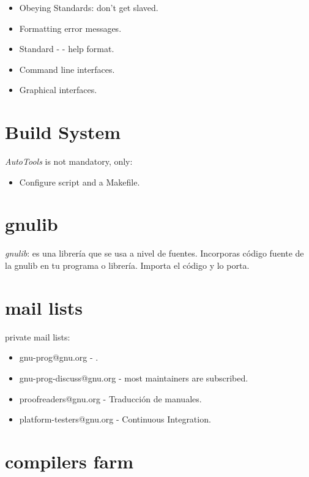 \documentclass[11pt]{scrartcl}
\begin{document}
\begin{itemize}
	\item Obeying Standards: don't get slaved.
	\item Formatting error messages.
	\item Standard - -  help format.
	\item Command line interfaces.
	\item Graphical interfaces.
\end{itemize}


\section{Build System}
\label{sec:build-system}

\emph{AutoTools} is not mandatory, only:

\begin{itemize}
	\item Configure script and a Makefile.
\end{itemize}


\section{gnulib}
\label{sec:gnulib}

\emph{gnulib}: es una librer\'ia que se usa a nivel de fuentes. Incorporas c\'odigo fuente de la gnulib en tu programa o librer\'ia. Importa el c\'odigo y lo porta.


\section{mail lists}
\label{sec:mail-lists}

private mail lists:
\begin{itemize}
	\item gnu-prog@gnu.org - .
	\item gnu-prog-discuss@gnu.org - most maintainers are subscribed.
	\item proofreaders@gnu.org - Traducci\'on de manuales.
	\item platform-testers@gnu.org - Continuous Integration.
\end{itemize}


\section{compilers farm}
\label{sec:compilers-farm}
\end{document}
